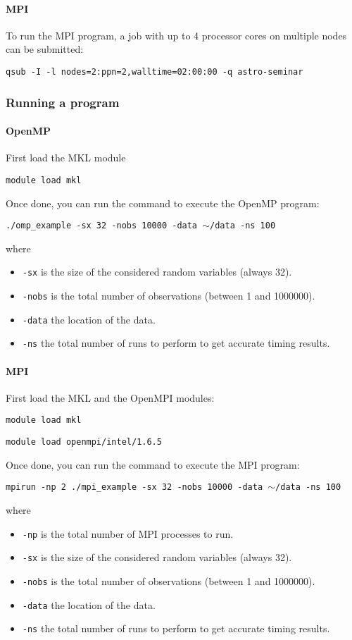 \documentclass[letterpaper,10pt]{article}
\begin{document}
\paragraph{MPI} To run the MPI program, a job with up to 4 processor cores on multiple nodes can be submitted:
\begin{center}
 \texttt{qsub -I -l nodes=2:ppn=2,walltime=02:00:00 -q astro-seminar}
\end{center}

\subsubsection{Running a program}
\paragraph{OpenMP} First load the MKL module
\begin{center}
 \texttt{module load mkl}
\end{center}
Once done, you can run the command to execute the OpenMP program:
\begin{center}
 \texttt{./omp\_example -sx 32 -nobs 10000 -data $\sim$/data -ns 100} 
\end{center}
where
\begin{itemize}
 \item \texttt{-sx} is the size of the considered random variables (always 32).
 \item \texttt{-nobs} is the total number of observations (between 1 and 1000000).
 \item \texttt{-data} the location of the data.
 \item \texttt{-ns} the total number of runs to perform to get accurate timing results.
 \end{itemize}


\paragraph{MPI} First load the MKL and the OpenMPI modules:
\begin{center}
 \texttt{module load mkl}
\end{center}
\begin{center}
 \texttt{module load openmpi/intel/1.6.5}
\end{center}
Once done, you can run the command to execute the MPI program:
\begin{center}
 \texttt{mpirun -np 2 ./mpi\_example -sx 32 -nobs 10000 -data $\sim$/data -ns 100} 
\end{center}
where
\begin{itemize}
 \item \texttt{-np} is the total number of MPI processes to run.
 \item \texttt{-sx} is the size of the considered random variables (always 32).
 \item \texttt{-nobs} is the total number of observations (between 1 and 1000000).
 \item \texttt{-data} the location of the data.
 \item \texttt{-ns} the total number of runs to perform to get accurate timing results.
 \end{itemize} 
 
\end{document}
